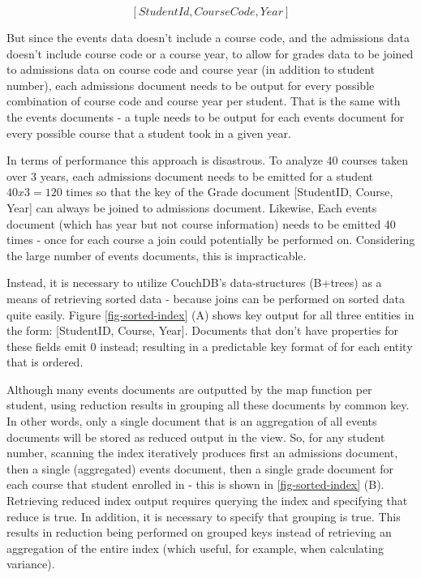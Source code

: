 \[[StudentId,CourseCode,Year]\]

But since the events data doesn't include a course code, and the admissions data doesn't include course code or a course year, to allow for grades data to be joined to admissions data on course code and course year (in addition to student number), each admissions document needs to be output for every possible combination of course code and course year per student. That is the same with the events documents - a tuple needs to be output for each events document for every possible course that a student took in a given year.

In terms of performance this approach is disastrous. To analyze 40 courses taken over 3 years, each admissions document needs to be emitted for a student $40 x 3 = 120$ times so that the key of the Grade document [StudentID, Course, Year] can always be joined to admissions document. Likewise, Each events document (which has year but not course information) needs to be emitted 40 times - once for each course a join could potentially be performed on. Considering the large number of events documents, this is impracticable.

Instead, it is necessary to utilize CouchDB's data-structures (B+trees) as a means of retrieving sorted data - because joins can be performed on sorted data quite easily. Figure \ref{fig-sorted-index} (A) shows key output for all three entities in the form: [StudentID, Course, Year]. Documents that don't have properties for these fields emit 0 instead; resulting in a predictable key format of for each entity that is ordered.

Although many events documents are outputted by the map function per student, using reduction results in grouping all these documents by common key. In other words, only a single document that is an aggregation of all events documents will be stored as reduced output in the view. So, for any student number, scanning the index iteratively produces first an admissions document, then a single (aggregated) events document, then a single grade document for each course that student enrolled in - this is shown in \ref{fig-sorted-index} (B). Retrieving reduced index output requires querying the index and specifying that reduce is true. In addition, it is necessary to specify that grouping is true. This results in reduction being performed on grouped keys instead of retrieving an aggregation of the entire index (which useful, for example, when calculating variance).



